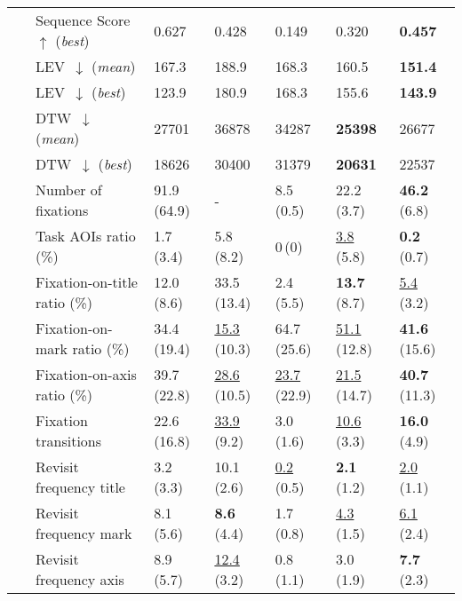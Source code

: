 \begin{table}[htbp]
\begin{tabular}{cl p{15mm} p{15mm}p{15mm}p{15mm}p{15mm}}
& Sequence Score~$\uparrow$ (\textit{best}) & 0.627 & 0.428 & 0.149 & 0.320 & {\cellcolor{good}} \textbf{0.457}\\ %
& LEV~$\downarrow$ (\textit{mean}) & 167.3 & 188.9 & 168.3 & 160.5 & {\cellcolor{good}} \textbf{151.4} \\ %
& LEV~$\downarrow$ (\textit{best}) & 123.9 & 180.9 & 168.3 & 155.6 & {\cellcolor{good}} \textbf{143.9} \\ %
& DTW~$\downarrow$ (\textit{mean}) & 27701 & 36878 & 34287 & {\cellcolor{good}} \textbf{25398} & 26677 \\ %
& DTW~$\downarrow$ (\textit{best}) & 18626 & 30400 & 31379 & {\cellcolor{good}} \textbf{20631} & 22537 \\ %
~ & Number of fixations        & 91.9\,(64.9) & - & 8.5\,(0.5) & 22.2\,(3.7) & {\cellcolor{good}} \textbf{46.2}\,(6.8)\\
~ & Task AOIs ratio (\%)       & 1.7\,(3.4) & 5.8\,(8.2) & 0\,(0) & {\cellcolor{good}} \underline{3.8}\,(5.8) & {\cellcolor{good}} \textbf{0.2}\,(0.7)\\
~ & Fixation-on-title ratio (\%) & 12.0\,(8.6) & 33.5\,(13.4) & 2.4\,(5.5) & {\cellcolor{good}} \textbf{13.7}\,(8.7) & {\cellcolor{good}} \underline{5.4}\,(3.2)\\
~ & Fixation-on-mark ratio (\%)  & 34.4\,(19.4) & {\cellcolor{good}} \underline{15.3}\,(10.3) & 64.7\,(25.6) & {\cellcolor{good}} \underline{51.1}\,(12.8) & {\cellcolor{good}} \textbf{41.6}\,(15.6)\\
~ & Fixation-on-axis ratio (\%)  & 39.7\,(22.8) & {\cellcolor{good}} \underline{28.6}\,(10.5) & {\cellcolor{good}} \underline{23.7}\,(22.9) & {\cellcolor{good}} \underline{21.5}\,(14.7) & {\cellcolor{good}} \textbf{40.7}\,(11.3)\\
~ & Fixation transitions        & 22.6\,(16.8) & {\cellcolor{good}} \underline{33.9}\,(9.2) & 3.0\,(1.6) & {\cellcolor{good}} \underline{10.6}\,(3.3) & {\cellcolor{good}} \textbf{16.0}\,(4.9)\\
~ & Revisit frequency title     & 3.2\,(3.3) & 10.1\,(2.6) & {\cellcolor{good}} \underline{0.2}\,(0.5) &{\cellcolor{good}} \textbf{2.1}\,(1.2) & {\cellcolor{good}} \underline{2.0}\,(1.1)\\
~ & Revisit frequency mark      & 8.1\,(5.6) & {\cellcolor{good}} \textbf{8.6}\,(4.4) & 1.7\,(0.8) & {\cellcolor{good}} \underline{4.3}\,(1.5) & {\cellcolor{good}} \underline{6.1}\,(2.4)\\
~ & Revisit frequency axis      & 8.9\,(5.7) & {\cellcolor{good}} \underline{12.4}\,(3.2) & 0.8\,(1.1) & 3.0\,(1.9) & {\cellcolor{good}} \textbf{7.7}\,(2.3)\\
\bottomrule
\end{tabular}
\label{tab:benchmark}
\end{table}

